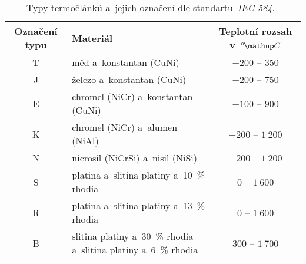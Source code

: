 \begin{table}[htbp]
    \centering
    \begin{tabular}{cm{7cm}c}
        \toprule
        Označení typu & Materiál & Teplotní rozsah v~$\C$\\
        \midrule
        T & měď a~konstantan (CuNi) & $-200$ -- $350$\phantom{$1~$}\\
        J & železo a~konstantan (CuNi)& $-200$ -- $750$\phantom{$1~$}\\
        E & chromel (NiCr) a~konstantan (CuNi) & $-100$ -- $900$\phantom{$1~$}\\
        K & chromel (NiCr) a~alumen (NiAl) & $-200$ -- $1~200$\\
        N & nicrosil (NiCrSi) a~nisil (NiSi) & $-200$ -- $1~200$\\
        S & platina a~slitina platiny a~10~\% rhodia & \phantom{$-00$}$0$ -- $1~600$\\
        R & platina a~slitina platiny a~13~\% rhodia & \phantom{$-00$}$0$ -- $1~600$\\
        B & slitina platiny a~30~\% rhodia a~slitina platiny 
            a~6~\% rhodia & \phantom{$-$}$300$ -- $1~700$\\
        \bottomrule
    \end{tabular}
    \caption{Typy termočlánků a~jejich označení dle 
    standartu~\emph{IEC 584}.~}
    \label{tab:iec584}
\end{table}
